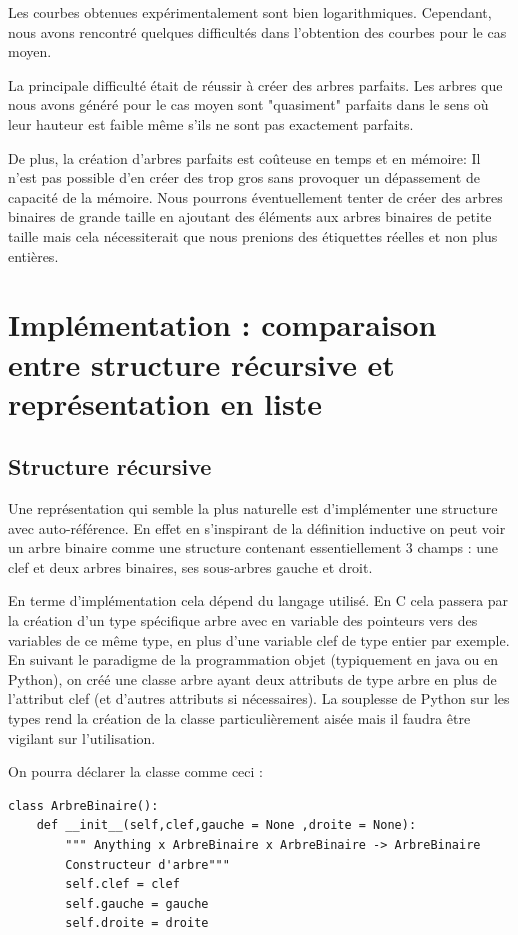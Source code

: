\documentclass{report}
\begin{document}
Les courbes obtenues expérimentalement sont bien logarithmiques.
Cependant, nous avons rencontré quelques difficultés dans l'obtention des courbes pour le cas moyen. 

La principale difficulté était de réussir à créer des arbres parfaits. Les arbres que nous avons généré pour le cas moyen sont "quasiment" parfaits dans le sens où leur hauteur est faible même s'ils ne sont pas exactement parfaits.

De plus, la création d'arbres parfaits est coûteuse en temps et en mémoire: Il n'est pas possible d'en créer des trop gros sans provoquer un dépassement de capacité de la mémoire.
Nous pourrons éventuellement tenter de créer des arbres binaires de grande taille en ajoutant des éléments aux arbres binaires de petite taille mais cela nécessiterait que nous prenions des étiquettes réelles et non plus entières. 


\chapter{Implémentation : comparaison entre structure récursive et représentation en liste}
\section{Structure récursive}
Une représentation qui semble la plus naturelle est d'implémenter une structure avec auto-référence. En effet en s'inspirant de la définition inductive on peut voir un arbre binaire comme une structure contenant essentiellement 3 champs : une clef et deux arbres binaires, ses sous-arbres gauche et droit. 

En terme d'implémentation cela dépend du langage utilisé. 
En C cela passera par la création d'un type spécifique arbre avec en variable des pointeurs vers des variables de ce même type, en plus d'une variable clef de type entier par exemple. 
En suivant le paradigme de la programmation objet (typiquement en java ou en Python), on créé une classe arbre ayant deux attributs de type arbre en plus de l'attribut clef (et d'autres attributs si nécessaires). La souplesse de Python sur les types rend la création de la classe particulièrement aisée mais il faudra être vigilant sur l'utilisation. 

On pourra déclarer la classe comme ceci :

\begin{lstlisting}
class ArbreBinaire():
    def __init__(self,clef,gauche = None ,droite = None):
        """ Anything x ArbreBinaire x ArbreBinaire -> ArbreBinaire
        Constructeur d'arbre"""
        self.clef = clef
        self.gauche = gauche
        self.droite = droite
\end{lstlisting}
\end{document}
